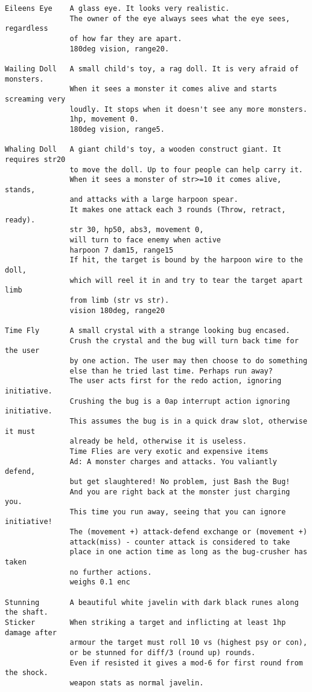 \begin{verbatim}
Eileens Eye    A glass eye. It looks very realistic.
               The owner of the eye always sees what the eye sees, regardless
               of how far they are apart.
               180deg vision, range20.

Wailing Doll   A small child's toy, a rag doll. It is very afraid of monsters.
               When it sees a monster it comes alive and starts screaming very
               loudly. It stops when it doesn't see any more monsters.
               1hp, movement 0.
               180deg vision, range5.

Whaling Doll   A giant child's toy, a wooden construct giant. It requires str20
               to move the doll. Up to four people can help carry it.
               When it sees a monster of str>=10 it comes alive, stands,
               and attacks with a large harpoon spear.
               It makes one attack each 3 rounds (Throw, retract, ready).
               str 30, hp50, abs3, movement 0,
               will turn to face enemy when active
               harpoon 7 dam15, range15
               If hit, the target is bound by the harpoon wire to the doll,
               which will reel it in and try to tear the target apart limb
               from limb (str vs str).
               vision 180deg, range20

Time Fly       A small crystal with a strange looking bug encased.
               Crush the crystal and the bug will turn back time for the user
               by one action. The user may then choose to do something
               else than he tried last time. Perhaps run away?
               The user acts first for the redo action, ignoring initiative.
               Crushing the bug is a 0ap interrupt action ignoring initiative.
               This assumes the bug is in a quick draw slot, otherwise it must
               already be held, otherwise it is useless.
               Time Flies are very exotic and expensive items
               Ad: A monster charges and attacks. You valiantly defend,
               but get slaughtered! No problem, just Bash the Bug!
               And you are right back at the monster just charging you.
               This time you run away, seeing that you can ignore initiative!
               The (movement +) attack-defend exchange or (movement +)
               attack(miss) - counter attack is considered to take
               place in one action time as long as the bug-crusher has taken
               no further actions.
               weighs 0.1 enc

Stunning       A beautiful white javelin with dark black runes along the shaft.
Sticker        When striking a target and inflicting at least 1hp damage after
               armour the target must roll 10 vs (highest psy or con),
               or be stunned for diff/3 (round up) rounds.
               Even if resisted it gives a mod-6 for first round from the shock.
               weapon stats as normal javelin.


\end{verbatim}
